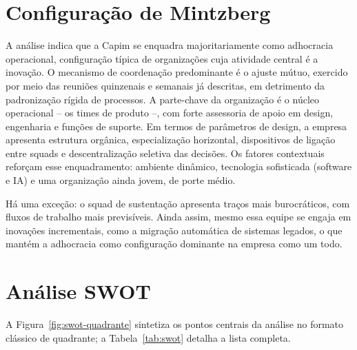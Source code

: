 \section{Configuração de Mintzberg}
\label{sec:mintzberg}

A análise indica que a Capim se enquadra majoritariamente como adhocracia operacional, configuração típica de organizações cuja atividade central é a inovação. O mecanismo de coordenação predominante é o ajuste mútuo, exercido por meio das reuniões quinzenais e semanais já descritas, em detrimento da padronização rígida de processos. A parte-chave da organização é o núcleo operacional -- os times de produto --, com forte assessoria de apoio em design, engenharia e funções de suporte. Em termos de parâmetros de design, a empresa apresenta estrutura orgânica, especialização horizontal, dispositivos de ligação entre squads e descentralização seletiva das decisões. Os fatores contextuais reforçam esse enquadramento: ambiente dinâmico, tecnologia sofisticada (software e IA) e uma organização ainda jovem, de porte médio.

Há uma exceção: o squad de sustentação apresenta traços mais burocráticos, com fluxos de trabalho mais previsíveis. Ainda assim, mesmo essa equipe se engaja em inovações incrementais, como a migração automática de sistemas legados, o que mantém a adhocracia como configuração dominante na empresa como um todo.

\section{Análise SWOT}
\label{sec:swot}

A Figura~\ref{fig:swot-quadrante} sintetiza os pontos centrais da análise no formato clássico de quadrante; a Tabela~\ref{tab:swot} detalha a lista completa.


